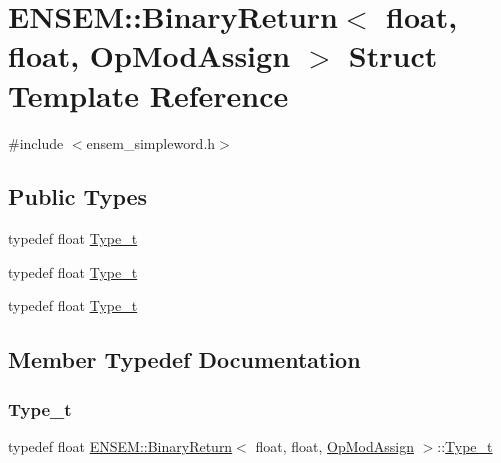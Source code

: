 \hypertarget{structENSEM_1_1BinaryReturn_3_01float_00_01float_00_01OpModAssign_01_4}{}\section{E\+N\+S\+EM\+:\+:Binary\+Return$<$ float, float, Op\+Mod\+Assign $>$ Struct Template Reference}
\label{structENSEM_1_1BinaryReturn_3_01float_00_01float_00_01OpModAssign_01_4}


{\ttfamily \#include $<$ensem\+\_\+simpleword.\+h$>$}

\subsection*{Public Types}
\begin{DoxyCompactItemize}
\item 
typedef float \mbox{\hyperlink{structENSEM_1_1BinaryReturn_3_01float_00_01float_00_01OpModAssign_01_4_ae702556f8b6bcd0be5c8369133fc5c95}{Type\+\_\+t}}
\item 
typedef float \mbox{\hyperlink{structENSEM_1_1BinaryReturn_3_01float_00_01float_00_01OpModAssign_01_4_ae702556f8b6bcd0be5c8369133fc5c95}{Type\+\_\+t}}
\item 
typedef float \mbox{\hyperlink{structENSEM_1_1BinaryReturn_3_01float_00_01float_00_01OpModAssign_01_4_ae702556f8b6bcd0be5c8369133fc5c95}{Type\+\_\+t}}
\end{DoxyCompactItemize}


\subsection{Member Typedef Documentation}
\mbox{\label{structENSEM_1_1BinaryReturn_3_01float_00_01float_00_01OpModAssign_01_4_ae702556f8b6bcd0be5c8369133fc5c95}} 
\subsubsection{\texorpdfstring{Type\_t}{Type\_t}\hspace{0.1cm}{\footnotesize\ttfamily [1/3]}}
{\footnotesize\ttfamily typedef float \mbox{\hyperlink{structENSEM_1_1BinaryReturn}{E\+N\+S\+E\+M\+::\+Binary\+Return}}$<$ float, float, \mbox{\hyperlink{structENSEM_1_1OpModAssign}{Op\+Mod\+Assign}} $>$\+::\mbox{\hyperlink{structENSEM_1_1BinaryReturn_3_01float_00_01float_00_01OpModAssign_01_4_ae702556f8b6bcd0be5c8369133fc5c95}{Type\+\_\+t}}}

